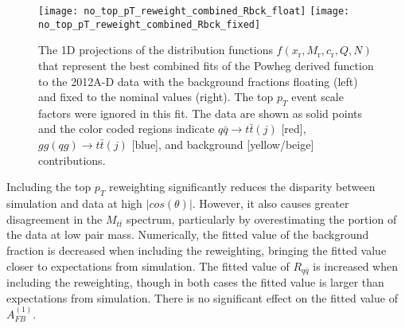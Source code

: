 \documentclass{cmspaperpdf}
\begin{document}
 \begin{figure}[hbt]
  \begin{center}
    \texttt{[image: no\_top\_pT\_reweight\_combined\_Rbck\_float]}
    \texttt{[image: no\_top\_pT\_reweight\_combined\_Rbck\_fixed]}
  \caption{\small The 1D projections of the distribution functions $f(x_\mathrm{r},M_\mathrm{r},c_\mathrm{r},Q,N)$ that represent the best combined fits of the Powheg derived function to the 2012A-D data with the background fractions floating (left) and fixed to the nominal values (right). The top $p_{T}$ event scale factors were ignored in this fit. The data are shown as solid points and the color coded regions indicate $q\bar q\to t\bar t(j)$ [red], $gg(qg)\to t\bar t(j)$ [blue], and background [yellow/beige] contributions.}
    \label{fig:no_pT_reweighting_fits}
  \end{center}
\end{figure}

Including the top $p_{T}$ reweighting significantly reduces the disparity between simulation and data at high $|cos(\theta)|$. However, it also causes greater disagreement in the $M_{t\bar{t}}$ spectrum, particularly by overestimating the portion of the data at low pair mass. Numerically, the fitted value of the background fraction is decreased when including the reweighting, bringing the fitted value closer to expectations from simulation. The fitted value of $R_{q\bar q}$ is increased when including the reweighting, though in both cases the fitted value is larger than expectations from simulation. There is no significant effect on the fitted value of $A^{(1)}_{FB}$.
\end{document}
